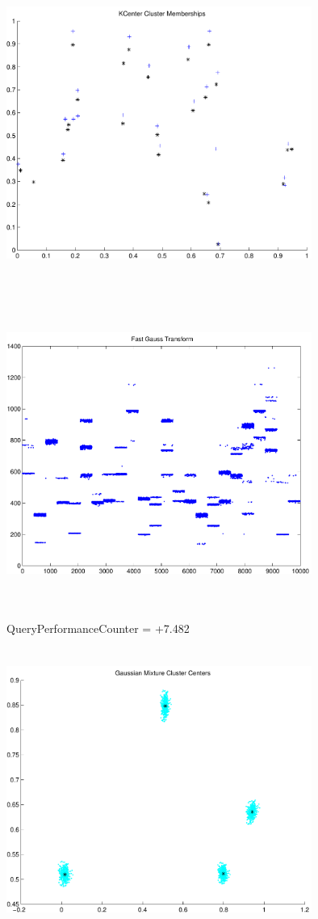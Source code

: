 \documentclass[9pt]{article}
\theoremstyle{plain}
\theoremstyle{definition}
\theoremstyle{remark}
\numberwithin{equation}{section}
\begin{document}
\includegraphics[width=10.0cm,height=10.0cm]{KCenterClusterMemberships_24_Centers.pdf}

\includegraphics[width=10.0cm,height=10.0cm]{FGT24_Centers.pdf}

QueryPerformanceCounter  =  +7.482
\includegraphics[width=10.0cm,height=10.0cm]{GaussianMixture_ClusterCenters4_Centers.pdf}
\end{document}

